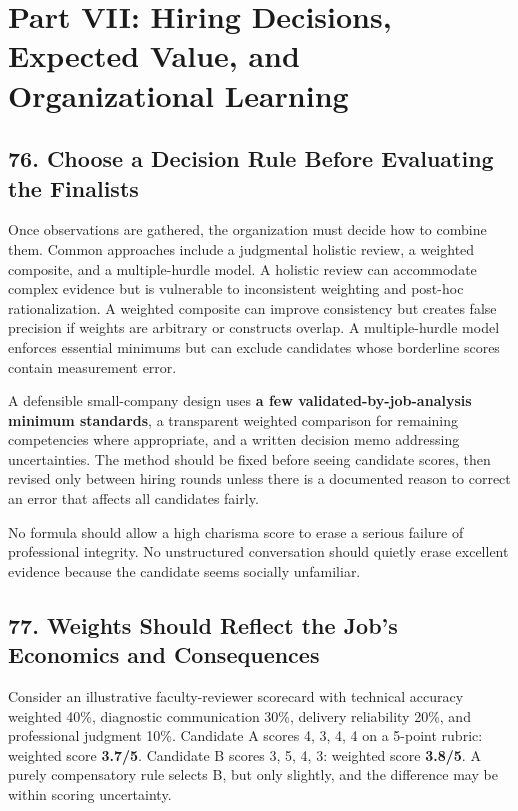 \section*{Part VII: Hiring Decisions, Expected Value, and Organizational Learning}

\subsection*{76. Choose a Decision Rule Before Evaluating the Finalists}

Once observations are gathered, the organization must decide how to combine them. Common approaches include a judgmental holistic review, a weighted composite, and a multiple-hurdle model. A holistic review can accommodate complex evidence but is vulnerable to inconsistent weighting and post-hoc rationalization. A weighted composite can improve consistency but creates false precision if weights are arbitrary or constructs overlap. A multiple-hurdle model enforces essential minimums but can exclude candidates whose borderline scores contain measurement error.

A defensible small-company design uses \textbf{a few validated-by-job-analysis minimum standards}, a transparent weighted comparison for remaining competencies where appropriate, and a written decision memo addressing uncertainties. The method should be fixed before seeing candidate scores, then revised only between hiring rounds unless there is a documented reason to correct an error that affects all candidates fairly.

No formula should allow a high charisma score to erase a serious failure of professional integrity. No unstructured conversation should quietly erase excellent evidence because the candidate seems socially unfamiliar.

\subsection*{77. Weights Should Reflect the Job's Economics and Consequences}

Consider an illustrative faculty-reviewer scorecard with technical accuracy weighted 40\%, diagnostic communication 30\%, delivery reliability 20\%, and professional judgment 10\%. Candidate A scores 4, 3, 4, 4 on a 5-point rubric: weighted score \textbf{3.7/5}. Candidate B scores 3, 5, 4, 3: weighted score \textbf{3.8/5}. A purely compensatory rule selects B, but only slightly, and the difference may be within scoring uncertainty.

